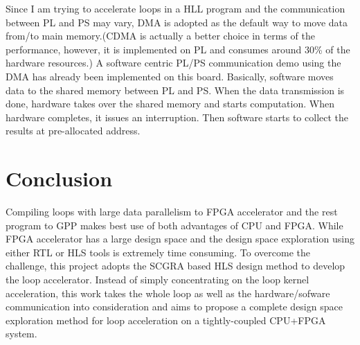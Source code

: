 \documentclass[12pt]{article} %
\begin{document}
Since I am trying to accelerate loops in a HLL program and the communication between PL and PS may
vary, DMA is adopted as the default way to move data from/to main memory.(CDMA is actually a better
choice in terms of the performance, however, it is implemented on PL and consumes around 30\% of
the hardware resources.) A software centric PL/PS communication demo using the DMA has already been 
implemented on this board. Basically, software moves data to the shared memory between PL and PS.
When the data transmission is done, hardware takes over the shared memory and starts computation.
When hardware completes, it issues an interruption. Then software starts to collect the results at
pre-allocated address.

\section{Conclusion} 
Compiling loops with large data parallelism to FPGA accelerator and the rest program to GPP makes best use of
both advantages of CPU and FPGA. While FPGA accelerator has a large design space and the design
space exploration using either RTL or HLS tools is extremely time consuming. To overcome the
challenge, this project adopts the SCGRA based HLS design method to develop the loop accelerator.
Instead of simply concentrating on the loop kernel acceleration, this work takes the whole loop as
well as the hardware/sofware communication into consideration and aims to propose a complete design
space exploration method for loop acceleration on a tightly-coupled CPU+FPGA system. 



\end{document}
